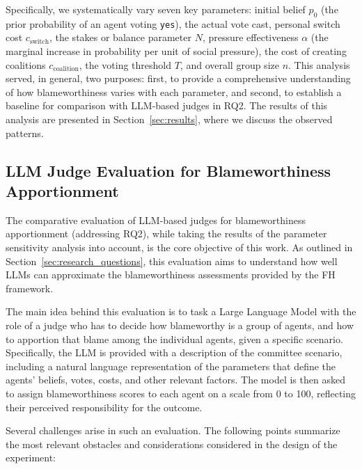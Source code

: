 \documentclass{article}
\begin{document}
Specifically, we systematically vary seven key parameters: initial belief $p_0$ (the prior probability of an agent voting \texttt{yes}), the actual vote cast, personal switch cost $c_\text{switch}$, the stakes or balance parameter $N$, pressure effectiveness $\alpha$ (the marginal increase in probability per unit of social pressure), the cost of creating coalitions $c_\text{coalition}$, the voting threshold $T$, and overall group size $n$. This analysis served, in general, two purposes: first, to provide a comprehensive understanding of how blameworthiness varies with each parameter, and second, to establish a baseline for comparison with LLM-based judges in RQ2. The results of this analysis are presented in Section~\ref{sec:results}, where we discuss the observed patterns.

\subsection{LLM Judge Evaluation for Blameworthiness Apportionment}\label{sec:llm_judges}

The comparative evaluation of LLM-based judges for blameworthiness apportionment (addressing RQ2), while taking the results of the parameter sensitivity analysis into account, is the core objective of this work. As outlined in Section~\ref{sec:research_questions}, this evaluation aims to understand how well LLMs can approximate the blameworthiness assessments provided by the FH framework. 

The main idea behind this evaluation is to task a Large Language Model with the role of a judge who has to decide how blameworthy is a group of agents, and how to apportion that blame among the individual agents, given a specific scenario. Specifically, the LLM is provided with a description of the committee scenario, including a natural language representation of the parameters that define the agents' beliefs, votes, costs, and other relevant factors. The model is then asked to assign blameworthiness scores to each agent on a scale from 0 to 100, reflecting their perceived responsibility for the outcome.

Several challenges arise in such an evaluation. The following points summarize the most relevant obstacles and considerations considered in the design of the experiment:
\end{document}
